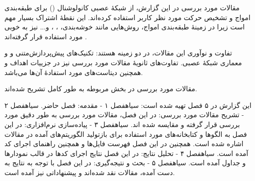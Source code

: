 مقالات مورد بررسی در این گزارش، از شبکهٔ عصبی کانولوشنال () برای طبقه‌بندی امواج  و تشخیص حرکت مورد نظر کاربر استفاده کرده‌اند. این نقطهٔ اشتراک بسیار مهم است زیرا در زمینهٔ طبقه‌بندی امواج، روش‌هایی مانند خوشه‌بندی، ، ،  و... نیز به خوبی مورد استفاده قرار گرفته‌اند .

تفاوت و نوآوری این مقالات، در دو زمینه هستند: تکنیک‌های پیش‌پردازش‌متنی{ و }
و معماری شبکهٔ عصبی. تفاوت‌های ثانویهٔ مقالات مورد بررسی نیز در جزییات اهداف و همچنین دیتاست‌های مورد استفادهٔ آن‌ها می‌باشد.

مقالات مورد بررسی در بخش مربوطه به طور کامل تشریح شده‌اند.

این گزارش در ۵ فصل تهیه شده است:
 ‌سیاه{فصل ۱ - مقدمه}: فصل حاضر.
 ‌سیاه{فصل ۲ - تشریح مقالات مورد بررسی}: در این فصل، مقالات مورد بررسی به طور دقیق مورد بررسی قرار گرفته و مقایسه شده اند.
 ‌سیاه{فصل ۳ - پیاده‌سازی نرم‌افزاری}: در این فصل به الگوها و کتابخانه‌های مورد استفاده برای بازتولید الگوریتم‌های آمده در مقالات اشاره شده است. همچنین در این فصل فهرست فایل‌ها و همچنین راهنمای اجرای کد آمده است.
 ‌سیاه{فصل ۴ - تحلیل نتایج}: در این فصل نتایج اجرای کد‌ها در قالب نمودارها و جداول آمده است.
 ‌سیاه{فصل ۵ - بحث و نتیجه‌گیری}: در این فصل با توجه به نتایج به دست آمده، مقالات نقد شده‌اند و پیشنهاداتی نیز آمده است.

